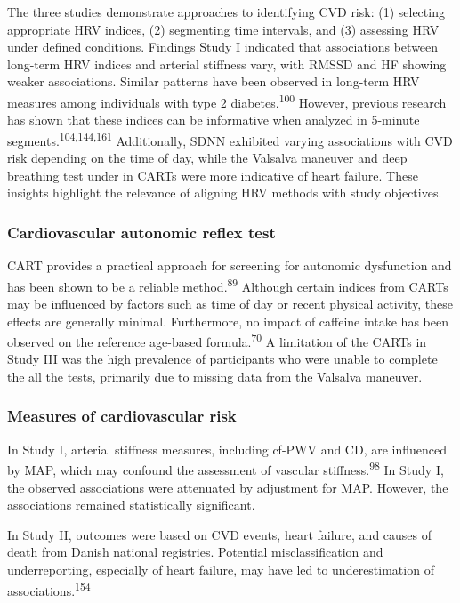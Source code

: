 \documentclass[
  a4paper,
  headsepline=true,
  open=left]{scrbook}
\begin{document}
The three studies demonstrate approaches to identifying CVD risk: (1)
selecting appropriate HRV indices, (2) segmenting time intervals, and
(3) assessing HRV under defined conditions. Findings Study I indicated
that associations between long-term HRV indices and arterial stiffness
vary, with RMSSD and HF showing weaker associations. Similar patterns
have been observed in long-term HRV measures among individuals with type
2 diabetes.\textsuperscript{100} However, previous research has shown
that these indices can be informative when analyzed in 5-minute
segments.\textsuperscript{104,144,161} Additionally, SDNN exhibited
varying associations with CVD risk depending on the time of day, while
the Valsalva maneuver and deep breathing test under in CARTs were more
indicative of heart failure. These insights highlight the relevance of
aligning HRV methods with study objectives.

\hypertarget{cardiovascular-autonomic-reflex-test}{%
\subsubsection{Cardiovascular autonomic reflex
test}\label{cardiovascular-autonomic-reflex-test}}

CART provides a practical approach for screening for autonomic
dysfunction and has been shown to be a reliable
method.\textsuperscript{89} Although certain indices from CARTs may be
influenced by factors such as time of day or recent physical activity,
these effects are generally minimal. Furthermore, no impact of caffeine
intake has been observed on the reference age-based
formula.\textsuperscript{70} A limitation of the CARTs in Study III was
the high prevalence of participants who were unable to complete the all
the tests, primarily due to missing data from the Valsalva maneuver.

\hypertarget{measures-of-cardiovascular-risk}{%
\subsubsection{Measures of cardiovascular
risk}\label{measures-of-cardiovascular-risk}}

In Study I, arterial stiffness measures, including cf-PWV and CD, are
influenced by MAP, which may confound the assessment of vascular
stiffness.\textsuperscript{98} In Study I, the observed associations
were attenuated by adjustment for MAP. However, the associations
remained statistically significant.

In Study II, outcomes were based on CVD events, heart failure, and
causes of death from Danish national registries. Potential
misclassification and underreporting, especially of heart failure, may
have led to underestimation of associations.\textsuperscript{154}
\end{document}
